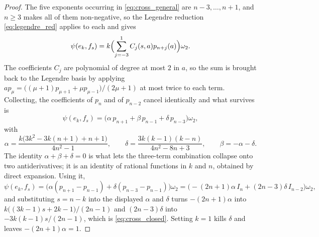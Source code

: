 \documentclass[10pt,a4paper]{amsart}
\begin{document}
\begin{proof}
The five exponents occurring in \eqref{eq:cross_general} are $n-3,\dots,n+1$,
and $n\geq3$ makes all of them non-negative, so the Legendre reduction
\eqref{eq:legendre_red} applies to each and gives
\[
  \psi(e_k,f_s)=k\Bigl(\sum_{j=-3}^{1}C_j(s,a)p_{n+j}(a)\Bigr)\omega_2 .
\]
The coefficients $C_j$ are polynomial of degree at most $2$ in $a$, so the sum
is brought back to the Legendre basis by applying
$ap_\mu=\bigl((\mu+1)p_{\mu+1}+\mu p_{\mu-1}\bigr)/(2\mu+1)$ at most twice to
each term. Collecting, the coefficients of $p_n$ and of $p_{n-2}$ cancel
identically and what survives is
\[
  \psi(e_k,f_s)=\bigl(\alpha\,p_{n+1}+\beta\,p_{n-1}+\delta\,p_{n-3}\bigr)\omega_2 ,
\]
with
\[
  \alpha=\frac{k\bigl(3k^2-3k(n+1)+n+1\bigr)}{4n^2-1},\qquad
  \delta=\frac{3k(k-1)(k-n)}{4n^2-8n+3},\qquad
  \beta=-\alpha-\delta .
\]
The identity $\alpha+\beta+\delta=0$ is what lets the three-term combination
collapse onto two antiderivatives; it is an identity of rational functions in
$k$ and $n$, obtained by direct expansion. Using it,
\[
  \psi(e_k,f_s)
   =\bigl(\alpha(p_{n+1}-p_{n-1})+\delta(p_{n-3}-p_{n-1})\bigr)\omega_2
   =\bigl(-(2n+1)\alpha\,I_n+(2n-3)\delta\,I_{n-2}\bigr)\omega_2 ,
\]
and substituting $s=n-k$ into the displayed $\alpha$ and $\delta$ turns
$-(2n+1)\alpha$ into $k\bigl((3k-1)s+2k-1\bigr)/(2n-1)$ and $(2n-3)\delta$ into
$-3k(k-1)s/(2n-1)$, which is \eqref{eq:cross_closed}. Setting $k=1$ kills
$\delta$ and leaves $-(2n+1)\alpha=1$.
\end{proof}
\end{document}
